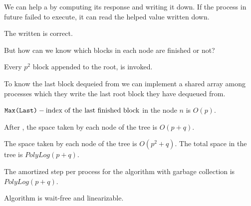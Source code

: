 We can help a  by computing its response and writing it down. If the process in future failed to execute, it can read the helped value written down.

\begin{lemma}
The  written is correct.
\end{lemma}

But how can we know which blocks in each node are finished or not? 

\begin{observation}
Every $p^2$ block appended to the root,  is invoked.  
\end{observation}

To know the last block dequeied from we can implement a shared array among processes which they write the last root block they have dequeued from. 

\begin{lemma}
    ${\normalfont{\texttt{Max(Last)}}} - \text{index of the last finished block}$ in the node $n$ is $O(p)$.
\end{lemma}

\begin{lemma}
    After , the space taken by each node of the tree is $O(p+q)$.
\end{lemma}

\begin{corollary}
The space taken by each node of the tree is $O(p^2+q)$. The total space in the tree is $PolyLog(p+q)$.
\end{corollary}

\begin{lemma}
  The amortized step per process for the algorithm with garbage collection is $PolyLog(p+q)$.
\end{lemma}

\begin{lemma}
  Algorithm is wait-free and linearizable.
\end{lemma}


